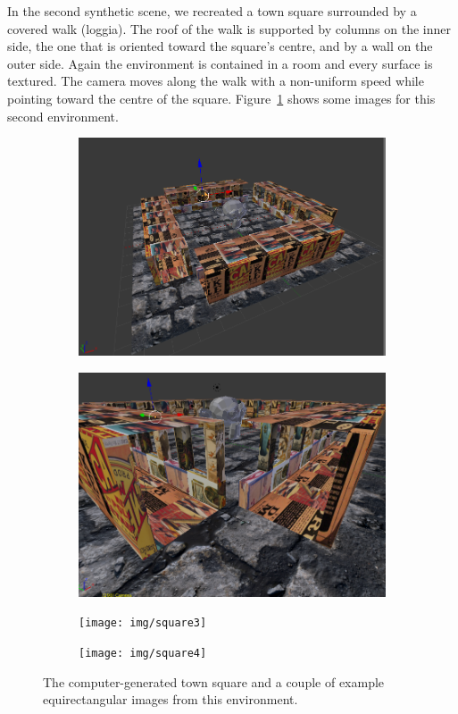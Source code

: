 In the second synthetic scene, we recreated a town square surrounded by
a covered walk (loggia). The roof of the walk is supported by columns on the inner
side, the one that is oriented toward the square's centre, and by a wall on the
outer side.
Again the environment is contained in a room and every surface is textured.
The camera moves along the walk with a non-uniform speed while pointing toward
the centre of the square. Figure~\ref{fig:test_square} shows some images
for this second environment.
%
\begin{figure}
\centering
	\begin{subfigure}{0.4\textwidth}
		\centering
		\includegraphics[width=\textwidth]{img/square1}
	\end{subfigure}
	\begin{subfigure}{0.4\textwidth}
		\centering
		\includegraphics[width=\textwidth]{img/square2}
	\end{subfigure}
	\begin{subfigure}{0.8\textwidth}
		\centering
		\texttt{[image: img/square3]}
	\end{subfigure}
	\begin{subfigure}{0.8\textwidth}
		\centering
		\texttt{[image: img/square4]}
	\end{subfigure}
	\caption{The computer-generated town square and a couple of example
	equirectangular images from this environment.}
    \label{fig:test_square}
\end{figure}

